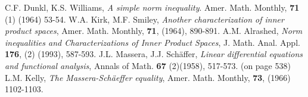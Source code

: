 \documentclass[12pt]{article}
\begin{document}
\begin{thebibliography}{99}
 C.F. Dunkl, K.S. Williams, \emph{A simple norm inequality}. Amer. Math. Monthly, \textbf{71} (1) (1964) 53-54.
 W.A. Kirk, M.F.  Smiley, \emph{Another characterization of inner product spaces}, Amer. Math. Monthly,
\textbf{71}, (1964), 890-891.
 A.M. Alrashed, \emph{Norm inequalities and Characterizations of Inner Product Spaces},
J. Math. Anal. Appl. \textbf{176}, (2) (1993), 587-593.
 J.L. Massera, J.J. Sch\"affer, \emph{Linear differential equations and functional analysis}, Annals of Math. \textbf{67} (2)(1958), 517-573. (on page 538)
L.M. Kelly, \emph{The Massera-Sch\"aeffer equality}, Amer. Math. Monthly, \textbf{73}, (1966) 1102-1103.
\end{thebibliography}

\end{document}
